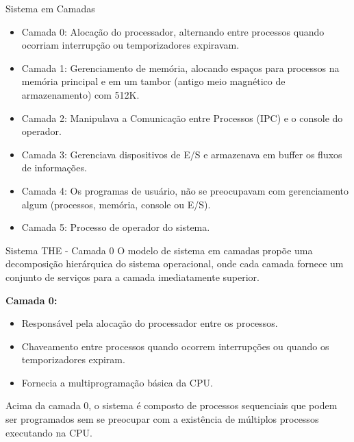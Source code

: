 \documentclass{beamer}
\begin{document}
\begin{frame}{Sistema em Camadas}
    \begin{itemize}
        \item Camada 0: Alocação do processador, alternando entre processos quando ocorriam interrupção ou temporizadores expiravam.
        \item Camada 1: Gerenciamento de memória, alocando espaços para processos na memória principal e em um tambor (antigo meio magnético de armazenamento) com 512K.
        \item Camada 2: Manipulava a Comunicação entre Processos (IPC) e o console do operador.
        \item Camada 3: Gerenciava dispositivos de E/S e armazenava em buffer os fluxos de informações.
        \item Camada 4: Os programas de usuário, não se preocupavam com gerenciamento algum (processos, memória, console ou E/S).
        \item Camada 5: Processo de operador do sistema.
    \end{itemize}
\end{frame}
\begin{frame}{Sistema THE -  Camada 0}
    O modelo de sistema em camadas propõe uma decomposição hierárquica do sistema operacional, onde cada camada fornece um conjunto de serviços para a camada imediatamente superior.

    \vspace{0.5cm}

    \textbf{Camada 0:}
    \begin{itemize}
        \item Responsável pela alocação do processador entre os processos.
        \item Chaveamento entre processos quando ocorrem interrupções ou quando os temporizadores expiram.
        \item Fornecia a multiprogramação básica da CPU.
    \end{itemize}

    \vspace{0.5cm}

    Acima da camada 0, o sistema é composto de processos sequenciais que podem ser programados sem se preocupar com a existência de múltiplos processos executando na CPU.
\end{frame}
\end{document}
